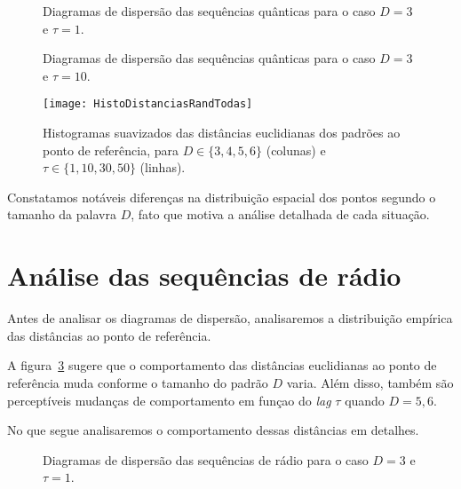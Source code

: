 \begin{figure}
\centering
{}
\caption{Diagramas de dispersão das sequências quânticas para o caso $D=3$ e $\tau=1$.}\label{Fig:QuantD3tau1}
\end{figure}

\begin{figure}
\centering
{}
\caption{Diagramas de dispersão das sequências quânticas para o caso $D=3$ e $\tau=10$.}\label{Fig:QuantD3tau10}
\end{figure}

\begin{figure}[hbt]
	\centering
	\texttt{[image: HistoDistanciasRandTodas]}
	\caption{Histogramas suavizados das distâncias euclidianas dos padrões ao ponto de referência, para $D\in\{3,4,5,6\}$ (colunas) e $\tau\in\{1,10,30,50\}$ (linhas).}\label{Fig:HistoDistanciasRandTodas}
\end{figure}



Constatamos notáveis diferenças na distribuição espacial dos pontos segundo o tamanho da palavra $D$, fato que motiva a análise detalhada de cada situação.

\section{Análise das sequências de rádio}


Antes de analisar os diagramas de dispersão, analisaremos a distribuição empírica das distâncias ao ponto de referência.

A figura~\ref{Fig:HistoDistanciasRandTodas} sugere que o comportamento das distâncias euclidianas ao ponto de referência muda conforme o tamanho do padrão $D$ varia.
Além disso, também são perceptíveis mudanças de comportamento em funçao do \textit{lag} $\tau$ quando $D=5,6$.

No que segue analisaremos o comportamento dessas distâncias em detalhes.


\begin{figure}
	\centering
	\caption{Diagramas de dispersão das sequências de rádio para o caso $D=3$ e $\tau=1$.}\label{Fig:QuantD3tau1}
\end{figure}

